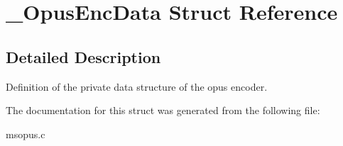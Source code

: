 \section{\-\_\-\-Opus\-Enc\-Data Struct Reference}
\label{struct__OpusEncData}


\subsection{Detailed Description}
Definition of the private data structure of the opus encoder. 

The documentation for this struct was generated from the following file\-:\begin{DoxyCompactItemize}
\item 
msopus.\-c\end{DoxyCompactItemize}
